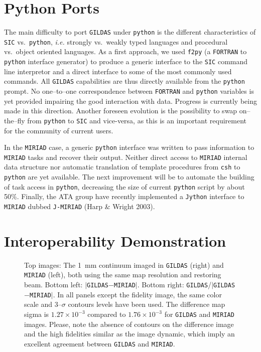 \documentclass[11pt,twoside]{article}  %
\newcommand{\FORTRAN}{\texttt{FORTRAN}}
\newcommand{\GILDAS}{\texttt{GILDAS}}
\newcommand{\MIRIAD}{\texttt{MIRIAD}}
\newcommand{\python}{\texttt{python}}
\newcommand{\fpig}{\texttt{f2py}}
\newcommand{\SIC}{\texttt{SIC}}
\newcommand{\ie} {{\em i.e.}}
\begin{document}
\section{Python Ports}

The main difficulty to port \GILDAS{} under \python{} is the different
characteristics of \SIC{} vs.\ \python{}, \ie{} strongly vs.\ weakly typed
languages and procedural vs.\ object oriented languages. As a first
approach, we used \fpig{} (a \FORTRAN{} to \python{} interface generator)
to produce a generic interface to the \SIC{} command line
interpretor and a direct interface to some of the most commonly used
commands. All \GILDAS{} capabilities are thus directly available from the
\python{} prompt. No one--to--one correspondence between \FORTRAN{} and
\python{} variables is yet provided impairing the good interaction with
data. Progress is currently being made in this direction. Another foreseen
evolution is the possibility to swap on--the--fly from \python{} to \SIC{}
and vice-versa, as this is an important requirement for the community of
current users.

In the \MIRIAD{} case, a generic \python{} interface was written to pass
information to \MIRIAD{} tasks and recover their output.  Neither direct
access to \MIRIAD{} internal data structure nor automatic translation of
template procedures from \texttt{csh} to \python{} are yet available. The
next improvement will be to automate the building of task access in
\python{}, decreasing the size of current \python{} script by about 50\%.
Finally, the ATA group have recently implemented a \texttt{Jython}
interface to \MIRIAD{} dubbed \texttt{J-MIRIAD} (Harp \& Wright 2003).

\section{Interoperability Demonstration}

\begin{figure}[t]
  \caption{Top images: The 1~mm continuum imaged in \GILDAS{} (right) and
    \MIRIAD{} (left), both using the same map resolution and restoring
    beam.  Bottom left: $|$\GILDAS{}$-$\MIRIAD{}$|$. Bottom right:
    \GILDAS{}/$|$\GILDAS{}$-$\MIRIAD{}$|$. In all panels except the
    fidelity image, the same color scale and 3--$\sigma$ contours levels
    have been used. The difference map sigma is $1.27\times10^{-3}$ compared to
    $1.76\times10^{-3}$ for \GILDAS{} and \MIRIAD{} images. Please, note the
    absence of contours on the difference image and the high fidelities
    similar as the image dynamic, which imply an excellent agreement
    between \GILDAS{} and \MIRIAD{}.}
  \label{fig:P4-14_f2}
\end{figure}
\end{document}
